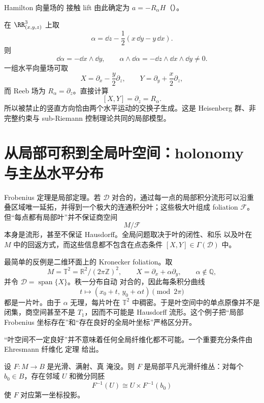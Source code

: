 Hamilton 向量场的 接触 lift 由此确定为 $a=-R_\alpha H$（）。

\begin{exbox}[三维 Heisenberg 接触 结构]
在 $\RR^3_{(x,y,z)}$ 上取
\[
\alpha=\dd z-\frac12(x\,\dd y-y\,\dd x).
\]
则
\[
\dd\alpha=-\dd x\wedge\dd y,
\qquad
\alpha\wedge\dd\alpha=-\dd z\wedge\dd x\wedge\dd y\neq0.
\]
一组水平向量场可取
\[
X=\partial_x-\frac y2\partial_z,
\qquad
Y=\partial_y+\frac x2\partial_z,
\]
而 Reeb 场为 $R_\alpha=\partial_z$。直接计算
\[
[X,Y]=\partial_z=R_\alpha.
\]
所以被禁止的竖直方向恰由两个水平运动的交换子生成。这是 Heisenberg 群、非完整约束与 sub-Riemann 控制理论共同的局部模型。
\end{exbox}



\section{从局部可积到全局叶空间：holonomy 与主丛水平分布}

Frobenius 定理是局部定理。若 $\mathcal D$ 对合的，通过每一点的局部积分流形可以沿重叠区域唯一延拓，并得到一个极大的连通积分叶；这些极大叶组成 foliation $\mathcal F$。但“每点都有局部叶”并不保证商空间
\[
 M/\mathcal F
\]
本身是流形，甚至不保证 Hausdorff。全局问题取决于叶的闭性、和乐 以及叶在 $M$ 中的回返方式，而这些信息都不包含在点态条件 $[X,Y]\in\Gamma(\mathcal D)$ 中。

最简单的反例是二维环面上的 Kronecker foliation。取
\[
 M=\mathbb T^2=\mathbb R^2/(2\pi\mathbb Z)^2,
 \qquad
 X=\partial_x+\alpha\partial_y,
 \qquad
 \alpha\notin\mathbb Q,
\]
并令 $\mathcal D=\operatorname{span}\{X\}$。秩一分布自动 对合的，因此每条积分曲线
\[
 t\longmapsto
 (x_0+t,\,y_0+\alpha t)\pmod{2\pi}
\]
都是一片叶。由于 $\alpha$ 无理，每片叶在 $\mathbb T^2$ 中稠密。于是叶空间中的单点原像并不是闭集，商空间甚至不是 $T_1$，因而不可能是 Hausdorff 流形。这个例子把“局部 Frobenius 坐标存在”和“存在良好的全局叶坐标”严格区分开。

“叶空间不一定良好”并不意味着任何全局纤维化都不可能。一个重要充分条件由 Ehresmann 纤维化 定理 给出。

\begin{theorem}\label{thm:math-dg-ehresmann-fibration}
设 $F:M\to B$ 是光滑、满射、真 淹没。则 $F$ 是局部平凡光滑纤维丛：对每个 $b_0\in B$，存在邻域 $U$ 和微分同胚
\begin{equation}
F^{-1}(U)\cong U\times F^{-1}(b_0)
\label{eq:math-dg-ehresmann-local-trivialization}
\end{equation}
使 $F$ 对应第一坐标投影。
\end{theorem}

